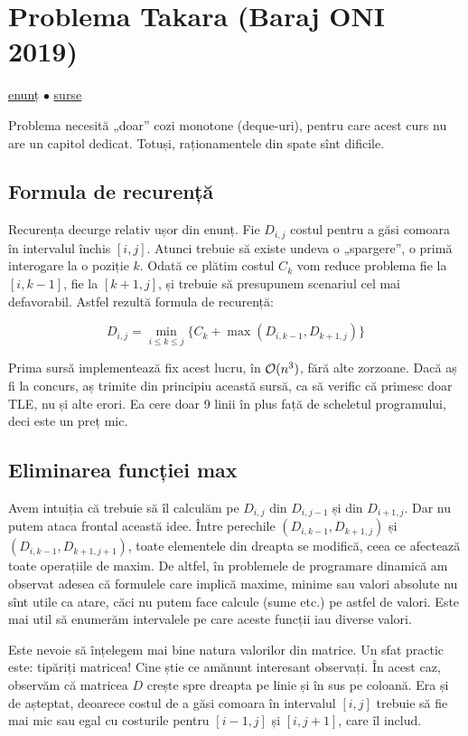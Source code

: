 \documentclass[../main.tex]{subfiles}
\begin{document}
\section{Problema Takara (Baraj ONI 2019)}
\label{problem:takara}

\href{https://kilonova.ro/problems/411}{enunț}
$\bullet$
\hyperref[code:takara]{surse}

Problema necesită „doar” cozi monotone (deque-uri), pentru care acest curs nu are un capitol dedicat. Totuși, raționamentele din spate sînt dificile.

\subsection{Formula de recurență}

Recurența decurge relativ ușor din enunț. Fie $D_{i,j}$ costul pentru a găsi comoara în intervalul închis $[i,j]$. Atunci trebuie să existe undeva o „spargere”, o primă interogare la o poziție $k$. Odată ce plătim costul $C_k$ vom reduce problema fie la $[i, k - 1]$, fie la $[k + 1, j]$, și trebuie să presupunem scenariul cel mai defavorabil. Astfel rezultă formula de recurență:

$$D_{i,j} = \min_{i \leq k \leq j} \{ C_k + \max(D_{i,k-1}, D_{k+1,j}) \}$$

Prima sursă implementează fix acest lucru, în $\mathcal{O}(n^3)$, fără alte zorzoane. Dacă aș fi la concurs, aș trimite din principiu această sursă, ca să verific că primesc doar TLE, nu și alte erori. Ea cere doar 9 linii în plus față de scheletul programului, deci este un preț mic.

\subsection{Eliminarea funcției max}

Avem intuiția că trebuie să îl calculăm pe $D_{i,j}$ din $D_{i,j-1}$ și din $D_{i+1,j}$. Dar nu putem ataca frontal această idee. Între perechile $(D_{i,k-1}, D_{k+1,j})$ și $(D_{i,k-1}, D_{k+1,j+1})$, toate elementele din dreapta se modifică, ceea ce afectează toate operațiile de maxim. De altfel, în problemele de programare dinamică am observat adesea că formulele care implică maxime, minime sau valori absolute nu sînt utile ca atare, căci nu putem face calcule (sume etc.) pe astfel de valori. Este mai util să enumerăm intervalele pe care aceste funcții iau diverse valori.

Este nevoie să înțelegem mai bine natura valorilor din matrice. Un sfat practic este: tipăriți matricea! Cine știe ce amănunt interesant observați. În acest caz, observăm că matricea $D$ crește spre dreapta pe linie și în sus pe coloană. Era și de așteptat, deoarece costul de a găsi comoara în intervalul $[i, j]$ trebuie să fie mai mic sau egal cu costurile pentru $[i - 1, j]$ și $[i, j + 1]$, care îl includ.
\end{document}

